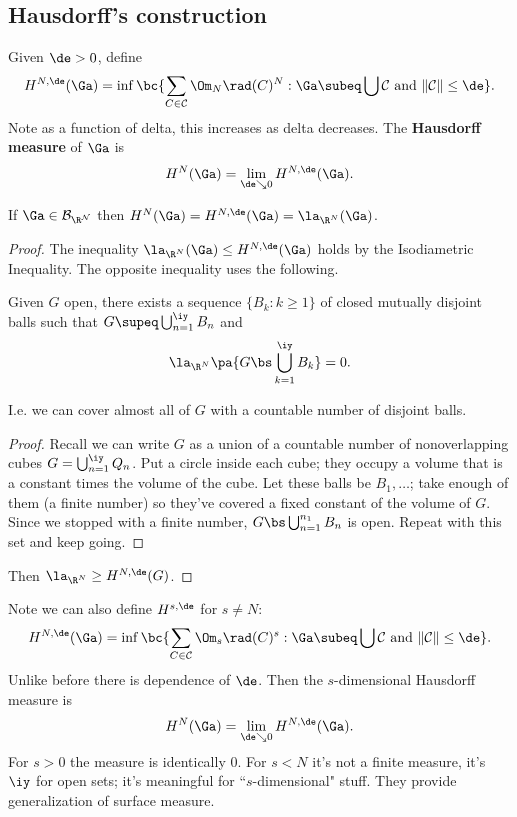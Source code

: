 \subsection{Hausdorff's construction}
\begin{df}
Given $\de>0$, define
\[
H^{N,\de} (\Ga)=\inf \bc{
\sum_{C\in \cal C} \Om_N\rad(C)^N:
\Ga\subeq \bigcup \cal C\text{ and }\Vert \cal C\Vert \le \de
}.
\]
Note as a function of delta, this increases as delta decreases. The \textbf{Hausdorff measure} of $\Ga$ is
\[
H^N(\Ga)=\lim_{\de\searrow 0} H^{N,\de}(\Ga).
\]
\end{df}
\begin{thm}
If $\Ga\in \cal B_{\R^N}$ then $H^N(\Ga)=H^{N,\de}(\Ga)=\la_{\R^N}(\Ga)$.
\end{thm}
\begin{proof}
The inequality $\la_{\R^N}(\Ga)\le H^{N,\de}(\Ga)$ holds by the Isodiametric Inequality. The opposite inequality uses the following.
\begin{lem}
Given $G$ open, there exists a sequence $\{B_k:k\ge 1\}$ of closed mutually disjoint balls such that $G\supeq \bigcup_{n=1}^{\iy} B_n$ and
\[
\la_{\R^N}\pa{G\bs\bigcup_{k=1}^{\iy} B_k
}=0.
\]
\end{lem}
I.e. we can cover almost all of $G$ with a countable number of disjoint balls.
\begin{proof}
Recall we can write $G$ as a union of a countable number of nonoverlapping cubes $G=\bigcup_{n=1}^{\iy} Q_n$. Put a circle inside each cube; they occupy a volume that is a constant times the volume of the cube. Let these balls be $B_1,\ldots$; take enough of them (a finite number) so they've covered a fixed constant of the volume of $G$. Since we stopped with a finite number, $G\bs \bigcup_{n=1}^{n_1} B_n$ is open. Repeat with this set and keep going.
\end{proof}
Then $\la_{\R^N}\ge H^{N,\de}(G)$.
\end{proof}
Note we can also define $H^{s,\de}$ for $s\ne N$:
\[
H^{N,\de} (\Ga)=\inf \bc{
\sum_{C\in \cal C} \Om_s\rad(C)^s:
\Ga\subeq \bigcup \cal C\text{ and }\Vert \cal C\Vert \le \de
}.
\]
Unlike before there is dependence of $\de$. 
Then the $s$-dimensional Hausdorff measure is
\[
H^N(\Ga)=\lim_{\de\searrow 0} H^{N,\de}(\Ga).
\]
For $s>0$ the measure is identically 0.
For $s<N$ it's not a finite measure, it's $\iy$ for open sets; it's meaningful for ``$s$-dimensional" stuff.
They provide generalization of surface measure.
